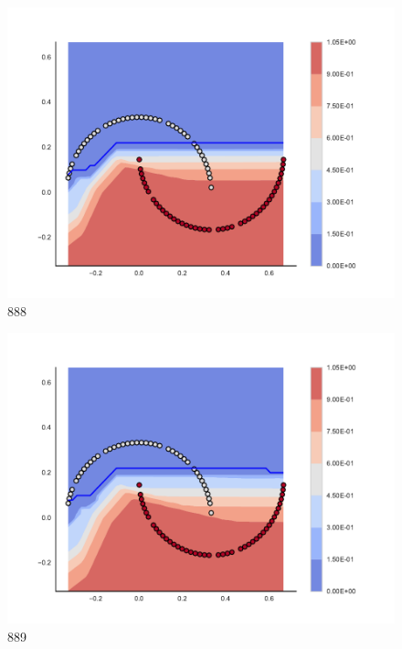 \begin{subfigure}[b]{0.09\textwidth}
    \includegraphics[clip, trim=2.35cm 1.75cm 4.5cm 0cm,width=\textwidth]{img/convergence/888.pdf}
    \caption{888}
    \label{fig:convergence_888}
\end{subfigure}
%
\begin{subfigure}[b]{0.09\textwidth}
    \includegraphics[clip, trim=2.35cm 1.75cm 4.5cm 0cm,width=\textwidth]{img/convergence/889.pdf}
    \caption{889}
    \label{fig:convergence_889}
\end{subfigure}
%
